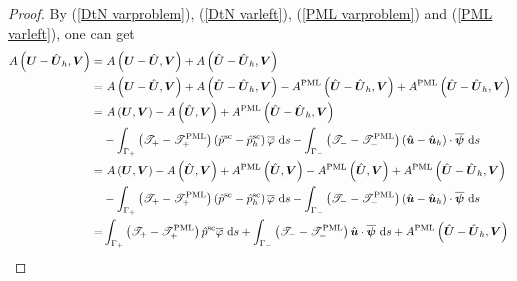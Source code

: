 \documentclass[final,3p,times]{elsarticle}
\begin{document}
\begin{proof}
	By (\ref{DtN varproblem}), (\ref{DtN varleft}), (\ref{PML varproblem}) and (\ref{PML varleft}), one can get
	\begin{align}
		A\left(\boldsymbol{U}-\hat{\boldsymbol{U}}_{h}, \boldsymbol{V}\right)=&~A\left(\boldsymbol{U}-\hat{\boldsymbol{U}}, \boldsymbol{V}\right)
		+ A\left(\hat{\boldsymbol{U}}-\hat{\boldsymbol{U}}_h, \boldsymbol{V}\right) \notag\\
		=&~A\left(\boldsymbol{U}-\hat{\boldsymbol{U}}, \boldsymbol{V}\right)
		+ A\left(\hat{\boldsymbol{U}}-\hat{\boldsymbol{U}}_h, \boldsymbol{V}\right) 
		-A^{\mathrm{PML}}\left(\hat{\boldsymbol{U}}-\hat{\boldsymbol{U}}_h, \boldsymbol{V}\right)
		+A^{\mathrm{PML}}\left(\hat{\boldsymbol{U}}-\hat{\boldsymbol{U}}_h, \boldsymbol{V}\right) \notag\\
		=&~A\left(\boldsymbol{U},\boldsymbol{V}\right)-A\left(\hat{\boldsymbol{U}},\boldsymbol{V}\right)+A^{\mathrm{PML}}\left(\hat{\boldsymbol{U}}-\hat{\boldsymbol{U}}_h, \boldsymbol{V}\right) \notag\\
		&-\int_{\Gamma_+}\left(\mathscr{T}_+-\mathscr{T}_+^{\mathrm{PML}}\right)\left(\hat{p}^{\mathrm{sc}}-\hat{p}^{\mathrm{sc}}_h\right) \overline{\varphi} \mathrm{~d}s -\int_{\Gamma_-}\left(\mathscr{T}_--\mathscr{T}_-^{\mathrm{PML}}\right)\left(\hat{\boldsymbol{u}}-\hat{\boldsymbol{u}}_h\right) \cdot \overline{\boldsymbol{\psi}} \mathrm{~d} s\notag \\
		=&~A\left(\boldsymbol{U},\boldsymbol{V}\right)-A\left(\hat{\boldsymbol{U}},\boldsymbol{V}\right)+A^{\mathrm{PML}}\left(\hat{\boldsymbol{U}},\boldsymbol{V}\right)-A^{\mathrm{PML}}\left(\hat{\boldsymbol{U}}, \boldsymbol{V}\right)
		+A^{\mathrm{PML}}\left(\hat{\boldsymbol{U}}-\hat{\boldsymbol{U}}_h, \boldsymbol{V}\right) \notag\\
		&-\int_{\Gamma_+}\left(\mathscr{T}_+-\mathscr{T}_+^{\mathrm{PML}}\right)\left(\hat{p}^{\mathrm{sc}}-\hat{p}^{\mathrm{sc}}_h\right) \overline{\varphi} \mathrm{~d} s
		-\int_{\Gamma_-}\left(\mathscr{T}_--\mathscr{T}_-^{\mathrm{PML}}\right)\left(\hat{\boldsymbol{u}}-\hat{\boldsymbol{u}}_h\right) \cdot \overline{\boldsymbol{\psi}} \mathrm{~d} s \notag\\
		=&\int_{\Gamma_+}\left(\mathscr{T}_+-\mathscr{T}_+^{\mathrm{PML}}\right)\hat{p}^{\mathrm{sc}} \overline{\varphi} \mathrm{~d} s
		+\int_{\Gamma_-}\left(\mathscr{T}_--\mathscr{T}_-^{\mathrm{PML}}\right)\hat{\boldsymbol{u}} \cdot \overline{\boldsymbol{\psi}} \mathrm{~d} s +A^{\mathrm{PML}}\left(\hat{\boldsymbol{U}}-\hat{\boldsymbol{U}}_h, \boldsymbol{V}\right) \notag\\

\end{align}
\end{proof}
\end{document}
